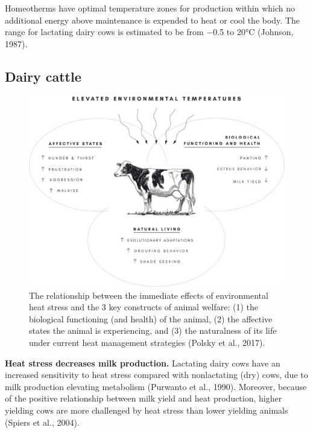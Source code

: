 \documentclass[]{book}
\begin{document}
Homeotherms have optimal temperature zones for production within which no additional energy above maintenance is expended to heat or cool the body. The range for lactating dairy cows is estimated to be from −0.5 to 20°C (Johnson, 1987).

\hypertarget{dairy-cattle}{%
\subsection{Dairy cattle}\label{dairy-cattle}}

\begin{figure}

{\centering \includegraphics[width=1\linewidth]{figures/heatstress-dairy} 

}

\caption{The relationship between the immediate effects of environmental heat stress and the 3 key constructs of animal welfare: (1) the biological functioning (and health) of the animal, (2) the affective states the animal is experiencing, and (3) the naturalness of its life under current heat management strategies (Polsky et al., 2017).}\label{fig:heat-dairy}
\end{figure}

\textbf{Heat stress decreases milk production.} Lactating dairy cows have an increased sensitivity to heat stress compared with nonlactating (dry) cows, due to milk production elevating metabolism (Purwanto et al., 1990). Moreover, because of the positive relationship between milk yield and heat production, higher yielding cows are more challenged by heat stress than lower yielding animals (Spiers et al., 2004).
\end{document}
